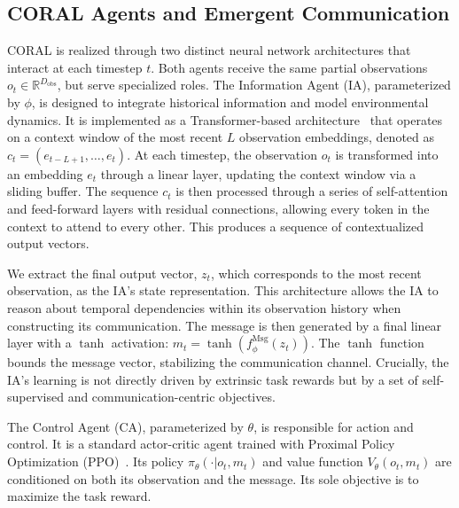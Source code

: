 \documentclass[letterpaper]{article} %
\begin{document}
\subsection{CORAL Agents and Emergent Communication}
CORAL is realized through two distinct neural network architectures that interact at each timestep $t$. Both agents receive the same partial observations  $o_t \in \mathbb{R}^{D_{\text{obs}}}$, but serve specialized roles. The Information Agent (IA), parameterized by $\phi$, is designed to integrate historical information and model environmental dynamics. It is implemented as a  Transformer-based architecture~\cite{vaswani2017attention} that operates on a context window of the most recent $L$ observation embeddings, denoted as $c_t = (e_{t-L+1}, \ldots, e_t)$. At each timestep, the observation $o_t$ is transformed into an embedding $e_t$ through a linear layer, updating the context window via a sliding buffer. The sequence $c_t$ is then processed through a series of self-attention and feed-forward layers with residual connections, allowing every token in the context to attend to every other. This produces a sequence of contextualized output vectors.

We extract the final output vector, $z_t$, which corresponds to the most recent observation, as the IA's state representation. This architecture allows the IA to reason about temporal dependencies within its observation history when constructing its communication. The message is then generated by a final linear layer with a $\tanh$ activation: $m_t = \tanh(f_{\phi}^{\text{Msg}}(z_t))$. The $\tanh$ function bounds the message vector, stabilizing the communication channel. Crucially, the IA's learning is not directly driven by extrinsic task rewards but by a set of self-supervised and communication-centric objectives.


The Control Agent (CA), parameterized by $\theta$, is responsible for action and control. It is a standard actor-critic agent trained with Proximal Policy Optimization (PPO)~\cite{schulman2017proximal}. Its policy $\pi_{\theta}(\cdot|o_t, m_t)$ and value function $V_{\theta}(o_t, m_t)$ are conditioned on both its observation and the message. Its sole objective is to maximize the task reward.
\end{document}
